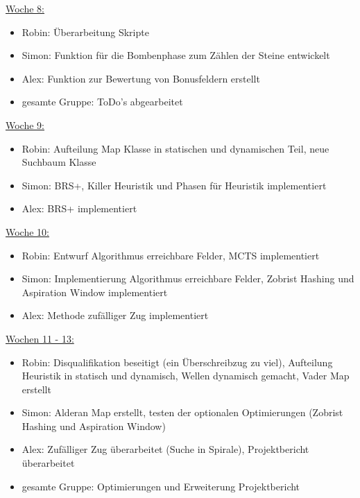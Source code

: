 \documentclass[12pt,a4paper,bibliography=totocnumbered,listof=totocnumbered]{article}
\begin{document}
\underline{Woche 8:}
\begin{itemize}
\item Robin: Überarbeitung Skripte
\item Simon: Funktion für die Bombenphase zum Zählen der Steine entwickelt
\item Alex: Funktion zur Bewertung von Bonusfeldern erstellt
\item gesamte Gruppe: ToDo's abgearbeitet
\end{itemize}
\underline{Woche 9:}
\begin{itemize}
\item Robin: Aufteilung Map Klasse in statischen und dynamischen Teil, neue Suchbaum Klasse
\item Simon: BRS+, Killer Heuristik und Phasen für Heuristik implementiert
\item Alex: BRS+ implementiert
\end{itemize}
\underline{Woche 10:}
\begin{itemize}
\item Robin: Entwurf Algorithmus erreichbare Felder, MCTS implementiert
\item Simon: Implementierung Algorithmus erreichbare Felder, Zobrist Hashing und Aspiration Window implementiert
\item Alex: Methode zufälliger Zug implementiert
\end{itemize}
\underline{Wochen 11 - 13:}
\begin{itemize}
\item Robin: Disqualifikation beseitigt (ein Überschreibzug zu viel), Aufteilung Heuristik in statisch und dynamisch, Wellen dynamisch gemacht, Vader Map erstellt
\item Simon: Alderan Map erstellt, testen der optionalen Optimierungen (Zobrist Hashing und Aspiration Window)
\item Alex: Zufälliger Zug überarbeitet (Suche in Spirale), Projektbericht überarbeitet
\item gesamte Gruppe: Optimierungen und Erweiterung Projektbericht
\end{itemize}

\newpage
\end{document}
